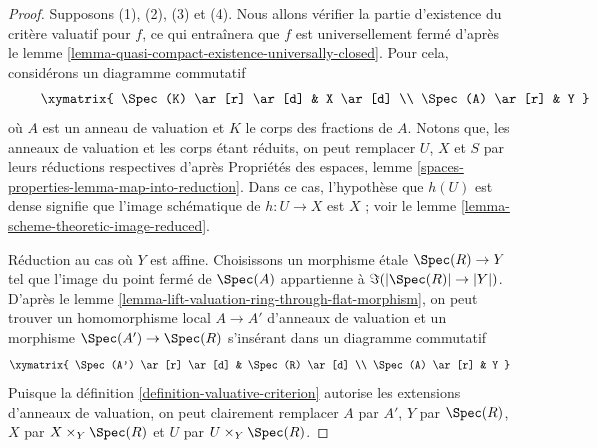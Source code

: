 \begin{proof}
Supposons (1), (2), (3) et (4).
Nous allons vérifier la partie d'existence du critère valuatif pour $f$,
ce qui entraînera que $f$ est universellement fermé d'après le
lemme \ref{lemma-quasi-compact-existence-universally-closed}.
Pour cela, considérons un diagramme commutatif
\begin{equation}
\label{equation-start-with}
\vcenter{
\xymatrix{
\Spec(K) \ar[r] \ar[d] & X \ar[d] \\
\Spec(A) \ar[r] & Y
}
}
\end{equation}
où $A$ est un anneau de valuation et $K$ le corps des fractions de $A$.
Notons que, les anneaux de valuation et les corps étant réduits, on peut
remplacer $U$, $X$ et $S$ par leurs réductions respectives d'après
Propriétés des espaces, lemme \ref{spaces-properties-lemma-map-into-reduction}.
Dans ce cas, l'hypothèse que $h(U)$ est dense signifie que
l'image schématique de $h : U \to X$ est $X$ ; voir le
lemme \ref{lemma-scheme-theoretic-image-reduced}.

\medskip\noindent
Réduction au cas où $Y$ est affine. Choisissons un morphisme étale
$\Spec(R) \to Y$ tel que l'image du point fermé de $\Spec(A)$
appartienne à $\Im(|\Spec(R)| \to |Y|)$. D'après le
lemme \ref{lemma-lift-valuation-ring-through-flat-morphism},
on peut trouver un homomorphisme local $A \to A'$ d'anneaux de valuation
et un morphisme $\Spec(A') \to \Spec(R)$ s'insérant dans un
diagramme commutatif
$$
\xymatrix{
\Spec(A') \ar[r] \ar[d] & \Spec(R) \ar[d] \\
\Spec(A) \ar[r] & Y
}
$$
Puisque la définition \ref{definition-valuative-criterion}
autorise les extensions d'anneaux de valuation,
on peut clairement remplacer $A$ par $A'$, $Y$ par $\Spec(R)$,
$X$ par $X \times_Y \Spec(R)$ et $U$ par $U \times_Y \Spec(R)$.


\end{proof}
